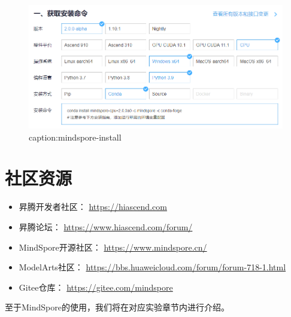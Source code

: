 \begin{figure}[htbp]
	\centering
	\includegraphics[width=1\textwidth]{figures/mindspore-install.png}
	\caption{caption:mindspore-install}
	\label{fig:mindspore-install}
\end{figure}

\section{社区资源}
\begin{itemize}
    \item {昇}腾开发者社区： \url{https://hiascend.com}
    \item {昇}腾论坛： \url{https://www.hiascend.com/forum/}
    \item MindSpore开源社区：  \url{https://www.mindspore.cn/}
    \item ModelArts社区：  \url{https://bbs.huaweicloud.com/forum/forum-718-1.html}
    \item Gitee仓库： \url{https://gitee.com/mindspore}
\end{itemize}



\vspace{3em}
至于MindSpore的使用，我们将在对应实验章节内进行介绍。